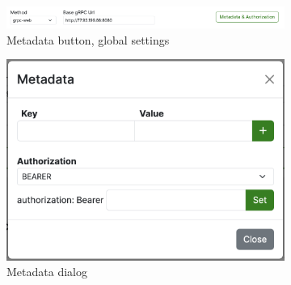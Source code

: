 \begin{figure}[!htb]
    \vspace{15mm}%

    \begin{subfigure}{.85\textwidth}
        \centering
        \includegraphics[width=.95\linewidth]{images/testing/screenshots/testing-top-bar}
        \caption{Metadata button, global settings}
        \label{fig:testing-changes-top-bar}
    \end{subfigure}%

    \vspace{15mm}%

    \begin{subfigure}{.45\textwidth}
        \centering
        \includegraphics[width=.95\linewidth]{images/testing/screenshots/testing-metadata}
        \caption{Metadata dialog}
        \label{fig:testing-changes-metadata}
    \end{subfigure}%
    \begin{subfigure}{.55\textwidth}
        \centering

\end{subfigure}
\end{figure}

